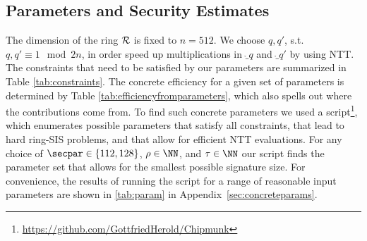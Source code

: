\subsection{Parameters and Security Estimates}
The dimension of the ring $\mathcal{R}$ is fixed to $n=512$. We choose $q,q'$, s.t.\ $q,q'\equiv 1\mod 2n$, in order speed up multiplications in $\ring_q$ and $\ring_{q'}$ by using NTT.
The constraints that need to be satisfied by our parameters are summarized in Table \ref{tab:constraints}.
The concrete efficiency for a given set of parameters is determined by Table \ref{tab:efficiencyfromparameters}, which also spells out where the contributions come from.
To find such concrete parameters we used a script\footnote{\label{fn:github}\url{https://github.com/GottfriedHerold/Chipmunk}}, which enumerates possible parameters that satisfy all constraints, that lead to hard ring-SIS problems, and that allow for efficient NTT evaluations.
For any choice of $\secpar\in\{112,128\}$, $\rho\in\NN$, and $\tau\in\NN$ our script finds the parameter set that allows for the smallest possible signature size.
For convenience, the results of running the script for a range of reasonable input parameters are shown in \autoref{tab:param} in Appendix~\ref{sec:concreteparams}.%
